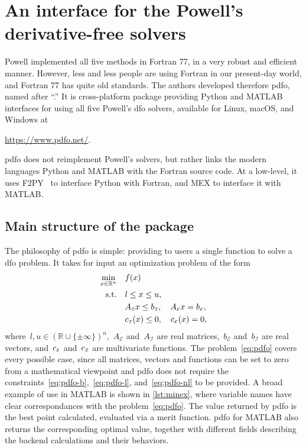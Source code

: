 \documentclass[11pt,draft]{article}
\numberwithin{equation}{section}
\newcommand{\R}{\mathbb{R}}
\newcommand{\set}[2][]{#1\{#2#1\}}
\newcommand{\aeq}{A_{\scriptscriptstyle\mathcal{E}}}
\newcommand{\aub}{A_{\scriptscriptstyle\mathcal{I}}}
\newcommand{\beq}{b_{\scriptscriptstyle\mathcal{E}}}
\newcommand{\bub}{b_{\scriptscriptstyle\mathcal{I}}}
\newcommand{\con}[1][i]{c\ifthenelse{\equal{#1}{}}{}{_{#1}}}
\newcommand{\ceq}{\con[\scriptscriptstyle\mathcal{E}]}
\newcommand{\cub}{\con[\scriptscriptstyle\mathcal{I}]}
\newcommand{\obj}{f}
\newcommand{\st}{\text{s.t.}}
\newcommand{\xl}{l}
\newcommand{\xu}{u}
\begin{document}
\section{An interface for the Powell's derivative-free solvers}
\label{sec:pdfo}

Powell implemented all five methods in Fortran 77, in a very robust and efficient manner.
However, less and less people are using Fortran in our present-day world, and Fortran 77 has quite old standards.
The authors developed therefore \gls{pdfo}, named after \enquote{.}
It is cross-platform package providing Python and MATLAB interfaces for using all five Powell's \gls{dfo} solvers, available for Linux, macOS, and Windows at
\begin{center}
    \url{https://www.pdfo.net/}.
\end{center}
\Gls{pdfo} does not reimplement Powell's solvers, but rather links the modern languages Python and MATLAB with the Fortran source code.
At a low-level, it uses F2PY~\cite{Peterson_2009} to interface Python with Fortran, and MEX to interface it with MATLAB.

\subsection{Main structure of the package}

The philosophy of \gls{pdfo} is simple: providing to users a single function to solve a \gls{dfo} problem.
It takes for input an optimization problem of the form
\begin{subequations}
    \label{eq:pdfo}
    \begin{align}
        \min_{x \in \R^n}   & \quad \obj(x)\\
        \st                 & \quad \xl \le x \le \xu, \label{eq:pdfo-b}\\
                            & \quad \aub x \le \bub, \quad \aeq x = \beq, \label{eq:pdfo-l}\\
                            & \quad \cub(x) \le 0, \quad \ceq(x) = 0, \label{eq:pdfo-nl}
    \end{align}
\end{subequations}
where~$\xl, \xu \in (\R \cup \set{\pm \infty})^n$,~$\aeq$ and~$\aub$ are real matrices,~$\beq$ and~$\bub$ are real vectors, and~$\ceq$ and~$\cub$ are multivariate functions.
The problem~\cref{eq:pdfo} covers every possible case, since all matrices, vectors and functions can be set to zero from a mathematical viewpoint and \gls{pdfo} does not require the constraints~\cref{eq:pdfo-b},~\cref{eq:pdfo-l}, and~\cref{eq:pdfo-nl} to be provided.
A broad example of use in MATLAB is shown in \cref{lst:minex}, where variable names have clear correspondances with the problem~\cref{eq:pdfo}.
The value returned by \gls{pdfo} is the best point calculated, evaluated via a merit function.
\gls{pdfo} for MATLAB also returns the corresponding optimal value, together with different fields describing the backend calculations and their behaviors.
\end{document}
